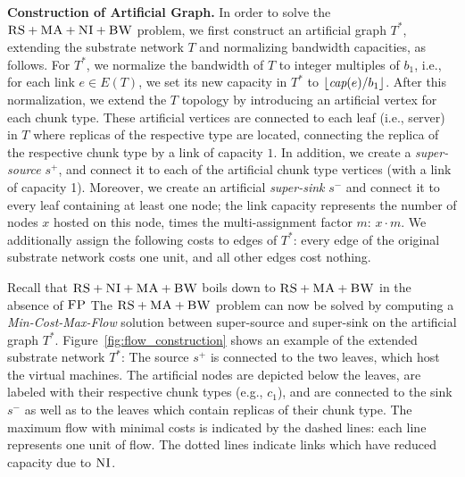 \documentclass[9pt]{sigcomm-alternate}
\newcommand{\maciek}[1]{\textcolor{brown}{maciek: #1}}
\newcommand{\MaFactor}{m}
\newcommand{\Source}{\ensuremath{s^{+}}}
\newcommand{\Sink}{\ensuremath{s^{-}}}
\newcommand{\achunk}{\ensuremath{c}}
\newcommand{\capacity}{\emph{cap}}
\newcommand{\CC}{\textsc{NI}}
\newcommand{\FP}{\textsc{FP}}
\newcommand{\RS}{\textsc{RS}}
\newcommand{\BW}{\textsc{BW}}
\newcommand{\MA}{\textsc{MA}}
\newcommand{\Tree}{\ensuremath{T}}
\newcommand{\CostTrans}{\ensuremath{b_1}}
\newcommand{\CostCom}{\ensuremath{b_2}}
\begin{document}


\textbf{Construction of Artificial Graph.}
In order to solve the $\RS+\MA+\CC+\BW$ problem,
we first construct
an artificial graph $\Tree^*$, extending the substrate network $\Tree$ and
normalizing bandwidth capacities, as follows. For $\Tree^*$,
we normalize the bandwidth of $\Tree$ to integer multiples of $\CostTrans$,
i.e., for each link $e\in E(\Tree)$, we set its new
capacity in $\Tree^*$ to $\lfloor\capacity(e)/\CostTrans\rfloor$.
After this normalization, we extend the $\Tree$ topology by
introducing an artificial vertex for each chunk type. These artificial
vertices are connected to each leaf (i.e., server) in $\Tree$ where replicas of the respective type are located,
connecting the replica of the respective chunk type by a link of capacity $1$. In
addition, we create a
\emph{super-source} $\Source$, and connect it to each of the artificial chunk
type vertices (with a link of capacity 1). Moreover, we create an artificial \emph{super-sink} $\Sink$ and
connect it to every leaf containing at least one node; the link capacity represents
the number of nodes $x$ hosted on this node, times the multi-assignment factor
$\MaFactor$:
$x \cdot \MaFactor$.
We additionally assign the following costs to edges of $\Tree^*$:
every edge of the original substrate network costs one unit, and all other edges
cost nothing.

Recall that $\RS+\CC+\MA+\BW$ boils down to
$\RS+\MA+\BW$ in the absence of $\FP$
The $\RS+\MA+\BW$ problem can now be solved by computing
a \emph{Min-Cost-Max-Flow} solution between super-source and super-sink on the artificial graph $\Tree^*$.
Figure~\ref{fig:flow_construction} shows an example of the extended substrate
network $\Tree^*$: The source $\Source$ is connected to the two leaves, which host the
virtual machines. The artificial nodes are depicted below the leaves, are labeled with
their respective chunk types (e.g., $\achunk_1$), and are connected to the sink
$\Sink$ as well as to the leaves which contain replicas of their chunk type.
The
maximum flow with minimal costs is indicated by the dashed lines: each line
represents one unit of flow. The dotted lines indicate links which have reduced
capacity due to $\CC$.
\end{document}
